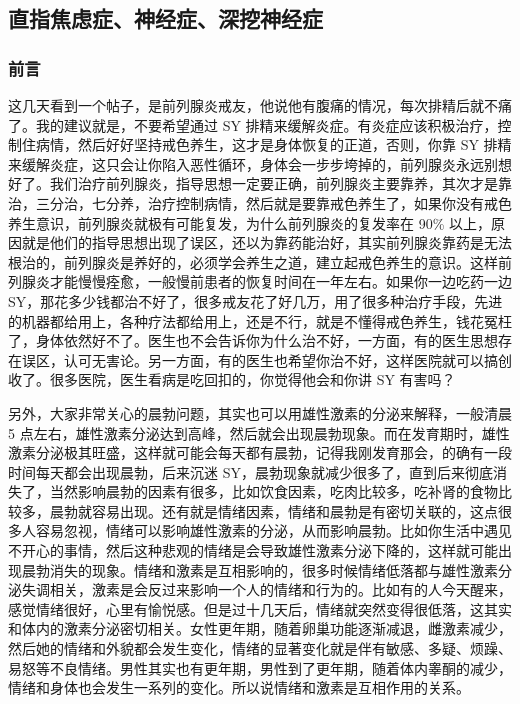 \documentclass{ctexart}
\begin{document}
\subsection{直指焦虑症、神经症、深挖神经症}

\subsubsection{前言}

这几天看到一个帖子，是前列腺炎戒友，他说他有腹痛的情况，每次排精后就不痛了。我的建议就是，不要希望通过 SY 排精来缓解炎症。有炎症应该积极治疗，控制住病情，然后好好坚持戒色养生，这才是身体恢复的正道，否则，你靠 SY 排精来缓解炎症，这只会让你陷入恶性循环，身体会一步步垮掉的，前列腺炎永远别想好了。我们治疗前列腺炎，指导思想一定要正确，前列腺炎主要靠养，其次才是靠治，三分治，七分养，治疗控制病情，然后就是要靠戒色养生了，如果你没有戒色养生意识，前列腺炎就极有可能复发，为什么前列腺炎的复发率在 90\% 以上，原因就是他们的指导思想出现了误区，还以为靠药能治好，其实前列腺炎靠药是无法根治的，前列腺炎是养好的，必须学会养生之道，建立起戒色养生的意识。这样前列腺炎才能慢慢痊愈，一般慢前患者的恢复时间在一年左右。如果你一边吃药一边 SY，那花多少钱都治不好了，很多戒友花了好几万，用了很多种治疗手段，先进的机器都给用上，各种疗法都给用上，还是不行，就是不懂得戒色养生，钱花冤枉了，身体依然好不了。医生也不会告诉你为什么治不好，一方面，有的医生思想存在误区，认可无害论。另一方面，有的医生也希望你治不好，这样医院就可以搞创收了。很多医院，医生看病是吃回扣的，你觉得他会和你讲 SY 有害吗？

另外，大家非常关心的晨勃问题，其实也可以用雄性激素的分泌来解释，一般清晨 5 点左右，雄性激素分泌达到高峰，然后就会出现晨勃现象。而在发育期时，雄性激素分泌极其旺盛，这样就可能会每天都有晨勃，记得我刚发育那会，的确有一段时间每天都会出现晨勃，后来沉迷 SY，晨勃现象就减少很多了，直到后来彻底消失了，当然影响晨勃的因素有很多，比如饮食因素，吃肉比较多，吃补肾的食物比较多，晨勃就容易出现。还有就是情绪因素，情绪和晨勃是有密切关联的，这点很多人容易忽视，情绪可以影响雄性激素的分泌，从而影响晨勃。比如你生活中遇见不开心的事情，然后这种悲观的情绪是会导致雄性激素分泌下降的，这样就可能出现晨勃消失的现象。情绪和激素是互相影响的，很多时候情绪低落都与雄性激素分泌失调相关，激素是会反过来影响一个人的情绪和行为的。比如有的人今天醒来，感觉情绪很好，心里有愉悦感。但是过十几天后，情绪就突然变得很低落，这其实和体内的激素分泌密切相关。女性更年期，随着卵巢功能逐渐减退，雌激素减少，然后她的情绪和外貌都会发生变化，情绪的显著变化就是伴有敏感、多疑、烦躁、易怒等不良情绪。男性其实也有更年期，男性到了更年期，随着体内睾酮的减少，情绪和身体也会发生一系列的变化。所以说情绪和激素是互相作用的关系。
\end{document}
